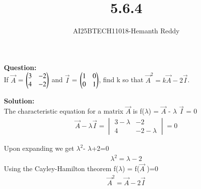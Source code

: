 \documentclass[journal]{IEEEtran}
\begin{document}

\vspace{3cm}

\title{5.6.4}
\author{AI25BTECH11018-Hemanth Reddy}
 \maketitle
{\let\newpage\relax\maketitle}

\renewcommand{\thefigure}{\theenumi}
\renewcommand{\thetable}{\theenumi}
\setlength{\intextsep}{10pt} %


\renewcommand{\thetable}{\theenumi}

\textbf{Question:}\\
If $\vec{A}$ = $\begin{pmatrix}3&-2\\4&-2\end{pmatrix}$ and $\vec{I}$ = $\begin{pmatrix}1&0\\0&1\end{pmatrix}$, find k so that $\vec{A}^{2}=k\vec{A}-2\vec{I}$.


\textbf{Solution:}\\

The characteristic equation for a matrix $\vec{A}$ is
f($\lambda$) = $\vec{A}$ - $\lambda$ $\vec{I}$ = 0 \\
\begin{align}
    \vec{A} - \lambda \vec{I} =\begin{vmatrix}
3 - \lambda & -2  \\
4& -2 - \lambda
\end{vmatrix} = 0
\end{align}

Upon expanding we get \qquad $\lambda^2$- $\lambda $+2=0\\
\begin{align}
     \lambda^2 = \lambda  -2
\end{align}
 Using the Cayley-Hamilton theorem f($\lambda$) = f($\vec{A}$ )=0
 \begin{align}
      \vec{A}^2 =  \vec{A}  -2\vec{I}
\end{align}
\end{document}
